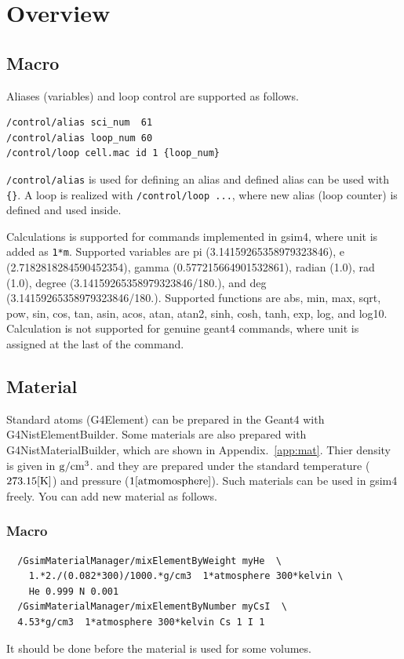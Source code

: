 \documentclass[a4paper,12pt]{article}
\begin{document}
 \section{Overview}
 \subsection{Macro}
 Aliases (variables) and loop control are supported as follows.
 \begin{screen}
  \begin{verbatim}
/control/alias sci_num  61
/control/alias loop_num 60
/control/loop cell.mac id 1 {loop_num}\end{verbatim}
 \end{screen}
{\tt /control/alias} is used for defining an alias and defined alias can
be used with {\tt \{\}}.
A loop is realized with {\tt /control/loop ...}, where new alias
(loop counter) is defined and used inside.

 Calculations is supported for commands
 implemented in gsim4, where unit is added as {\tt 1*m}.
 Supported variables are
 pi (3.14159265358979323846),
 e (2.7182818284590452354),
 gamma (0.577215664901532861),
 radian (1.0),
 rad (1.0),
 degree (3.14159265358979323846/180.), and
 deg (3.14159265358979323846/180.).
 Supported functions are
 abs,
 min,
 max,
 sqrt,
 pow,
 sin,
 cos,
 tan,
 asin,
 acos,
 atan,
 atan2,
 sinh,
 cosh,
 tanh,
 exp,
 log, and
 log10.
 Calculation is not supported for genuine geant4
 commands, where unit is assigned at the last of the command.
 \subsection{Material}
 Standard atoms (G4Element) can be prepared in the Geant4 with
 G4NistElementBuilder. Some materials are also prepared with
 G4NistMaterialBuilder, which are shown in Appendix.~\ref{app:mat}.
 Thier density is given in ${\rm g}/{\rm
 cm}^3$. and they are prepared under the standard temperature
 ($273.15 [{\rm K}]$) and pressure ($1 [{\rm atmomosphere}]$).
 Such materials can be used in gsim4 freely. You can add new
 material as follows.
 \subsubsection{Macro}
 \begin{screen}
  \begin{verbatim}
  /GsimMaterialManager/mixElementByWeight myHe  \ 
    1.*2./(0.082*300)/1000.*g/cm3  1*atmosphere 300*kelvin \
    He 0.999 N 0.001
  /GsimMaterialManager/mixElementByNumber myCsI  \ 
  4.53*g/cm3  1*atmosphere 300*kelvin Cs 1 I 1\end{verbatim}
 \end{screen}
 It should be done before the material is used for some volumes.
\end{document}
